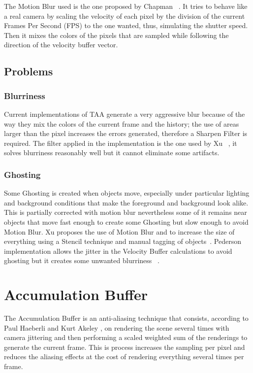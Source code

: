 \documentclass{cslthse-msc}
\begin{document}
The Motion Blur used is the one proposed by Chapman ~\cite{Chapman2012}. It tries to behave like a real camera by scaling the velocity of each pixel by the division of the current Frames Per Second (FPS) to the one wanted, thus, simulating the shutter speed. Then it mixes the colors of the pixels that are sampled while following the direction of the velocity buffer vector.

\subsection{Problems}
\subsubsection{Blurriness} 
Current implementations of TAA generate a very aggressive blur because of the way they mix the colors of the current frame and the history; the use of areas larger than the pixel increases the errors generated, therefore a Sharpen Filter is required. The filter applied in the implementation is the one used by Xu ~\cite{XU2016}, it solves blurriness reasonably well but it cannot eliminate some artifacts. 

\subsubsection{Ghosting} 
Some Ghosting is created when objects move, especially under particular lighting and background conditions that make the foreground and background look alike. This is partially corrected with motion blur nevertheless some of it remains near objects that move fast enough to create some Ghosting but slow enough to avoid Motion Blur. Xu proposes the use of Motion Blur and to increase the size of everything using a Stencil technique and manual tagging of objects~\cite{XU2016}. Pederson implementation allows the jitter in the Velocity Buffer calculations to avoid ghosting but it creates some unwanted blurriness ~\cite{Fuglsand2016}. 

\section{Accumulation Buffer}
The Accumulation Buffer is an anti-aliasing technique that consists, according to Paul Haeberli and Kurt Akeley \cite{Haeberli1990}, on rendering the scene several times with camera jittering and then performing a scaled weighted sum of the renderings to generate the current frame.
This is process increases the sampling per pixel and reduces the aliasing effects at the cost of rendering everything several times per frame.
\end{document}
